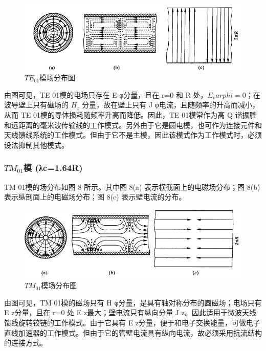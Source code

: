 \begin{figure}[htbp]
	\centering
	\includegraphics[width=0.7\linewidth]{img/3-6-2}
	\caption{$TE_{01}$模场分布图}
	\label{fig:3-6-2}
\end{figure}

由图可见，TE 01​模的电场只存在 E φ​分量，且在 r=0 和 R 处，$ E_varphi = 0 $；在波导壁上只有磁场的  $H_z$ 分量，故在壁上只有 J φ电流，且随频率的升高而减小，从而 TE 01​模的导体损耗随频率升高而降低。因此，TE 01模常作为高 Q 谐振腔和远距离的毫米波传输线的工作模式。另外由于它是圆电模，也可作为连接元件和天线馈线系统的工作模式。但由于它不是主模，因此该模式作为工作模式时，必须设法抑制其他模式。

\subsubsection{ $TM_{01}$模 (λc=1.64R)} 
TM 01模的场分布如图 8 所示。其中图 8(a) 表示横截面上的电磁场分布；图 8(b) 表示纵剖面上的电磁场分布；图 8(c) 表示壁电流的分布。

\begin{figure}[htbp]
	\centering
	\includegraphics[width=0.7\linewidth]{img/3-6-3}
	\caption{$TM_{01}$模场分布图}
	\label{fig:3-6-3}
\end{figure}

由图可见，TM 01​模的磁场只有 H φ​分量，是具有轴对称分布的圆磁场；电场只有 E z分量，且在 r=0 处 E z​最大；壁电流只有纵向分量 J z​。因此适用于微波天线馈线旋转铰链的工作模式。由于它具有 E z分量，便于和电子交换能量，可做电子直线加速器的工作模式。但由于它的管壁电流具有纵向电流，故必须采用抗流结构的连接方式。






